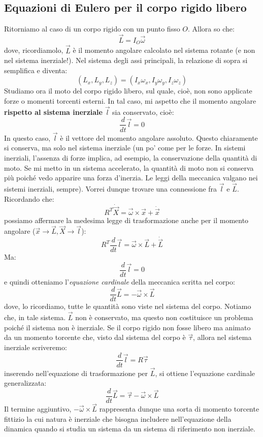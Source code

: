 \documentclass[a4paper,openany]{article}
\begin{document}
	\subsection{Equazioni di Eulero per il corpo rigido libero}
	Ritorniamo al caso di un corpo rigido con un punto fisso $O$. Allora so che:
	$$
	\vec{L} = I_{O}\vec\omega
	$$
	dove, ricordiamolo, $\vec{L}$ è il momento angolare calcolato nel sistema rotante (e non nel sistema inerziale!). Nel sistema degli assi principali, la relazione di sopra si semplifica e diventa:
	$$
	(L_x,L_y,L_z) = (I_x\omega_x,I_y\omega_y,I_z\omega_z)
	$$
	Studiamo ora il moto del corpo rigido libero, sul quale, cioè, non sono applicate forze o momenti torcenti esterni. In tal caso, mi aspetto che il momento angolare \textbf{rispetto al sistema inerziale} $\vec{l}$ sia conservato, cioè:
	$$
	\dfrac{d}{dt}\vec{l} = 0
	$$
	In questo caso, $\vec{l}$ è il vettore del momento angolare assoluto. Questo chiaramente si conserva, ma solo nel sistema inerziale (un po' come per le forze. In sistemi inerziali, l'assenza di forze implica, ad esempio, la conservazione della quantità di moto. Se mi metto in un sistema accelerato, la quantità di moto non si conserva più poiché vedo apparire una forza d'inerzia. Le leggi della meccanica valgano nei sistemi inerziali, sempre). Vorrei dunque trovare una connessione fra $\vec{l}$ e $\vec{L}$. Ricordando che:
	$$
	R^{T}\dot{\vec{X}} = \vec{\omega}\times\vec{x} + \dot{\vec{x}}
	$$
	possiamo affermare la medesima legge di trasformazione anche per il momento angolare ($\vec{x} \rightarrow \vec{L}, \vec{X}\rightarrow\vec{l}$):
	\begin{equation}\label{key}
		R^{T}\dfrac{d}{dt}\vec{l} = \vec{\omega}\times\vec{L} + \dot{\vec{L}} 
	\end{equation}
	Ma:
	$$
	\dfrac{d}{dt}\vec{l} = 0
	$$
	e quindi otteniamo l'\textit{equazione cardinale} della meccanica scritta nel corpo:
	\begin{equation}
		\dfrac{d}{dt}\vec{L} = -\vec{\omega}\times\vec{L}
		\label{EqCard}
	\end{equation}
	dove, lo ricordiamo, tutte le quantità sono viste nel sistema del corpo. Notiamo che, in tale sistema. $\vec{L}$ non è conservato, ma questo non costituisce un problema poiché il sistema non è inerziale. Se il corpo rigido non fosse libero ma animato da un momento torcente che, visto dal sistema del corpo è $\vec{\tau}$, allora nel sistema inerziale scriveremo:
	$$
	\dfrac{d}{dt}\vec{l} = R\vec\tau
	$$
	inserendo nell'equazione di trasformazione per $\vec{L}$, si ottiene l'equazione cardinale generalizzata:
	\begin{equation}
		\dfrac{d}{dt}\vec{L} = \vec{\tau} - \vec{\omega}\times\vec{L}
	\end{equation}
	Il termine aggiuntivo, $-\vec{\omega}\times\vec{L}$ rappresenta dunque una sorta di momento torcente fittizio la cui natura è inerziale che bisogna includere nell'equazione della dinamica quando si studia un sistema da un sistema di riferimento non inerziale.
	
\end{document}
